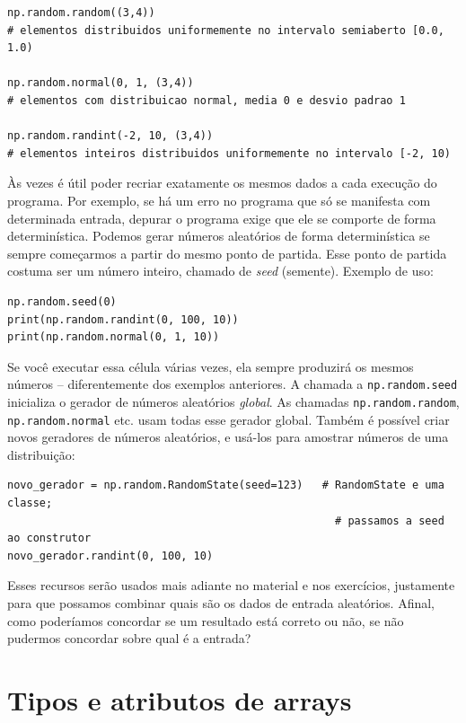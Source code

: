 \documentclass[11pt,a4paper]{article}
\begin{document}
\begin{lstlisting}
np.random.random((3,4))
# elementos distribuidos uniformemente no intervalo semiaberto [0.0, 1.0)

np.random.normal(0, 1, (3,4))
# elementos com distribuicao normal, media 0 e desvio padrao 1

np.random.randint(-2, 10, (3,4))
# elementos inteiros distribuidos uniformemente no intervalo [-2, 10)
\end{lstlisting}

Às vezes é útil poder recriar exatamente os mesmos dados a cada execução
do programa. Por exemplo, se há um erro no programa que só se manifesta
com determinada entrada, depurar o programa exige que ele se comporte de
forma determinística. Podemos gerar números aleatórios de forma
determinística se sempre começarmos a partir do mesmo ponto de partida.
Esse ponto de partida costuma ser um número inteiro, chamado de
\emph{seed} (semente). Exemplo de uso:

\begin{lstlisting}
np.random.seed(0)
print(np.random.randint(0, 100, 10))
print(np.random.normal(0, 1, 10))
\end{lstlisting}

Se você executar essa célula várias vezes, ela sempre produzirá os
mesmos números -- diferentemente dos exemplos anteriores. A chamada a
\texttt{np.random.seed} inicializa o gerador de números aleatórios
\emph{global}. As chamadas \texttt{np.random.random},
\texttt{np.random.normal} etc. usam todas esse gerador global. Também é
possível criar novos geradores de números aleatórios, e usá-los para
amostrar números de uma distribuição:

\begin{lstlisting}
novo_gerador = np.random.RandomState(seed=123)   # RandomState e uma classe;
                                                   # passamos a seed ao construtor
novo_gerador.randint(0, 100, 10)
\end{lstlisting}

Esses recursos serão usados mais adiante no material e nos exercícios,
justamente para que possamos combinar quais são os dados de entrada
aleatórios. Afinal, como poderíamos concordar se um resultado está
correto ou não, se não pudermos concordar sobre qual é a entrada?

\section{Tipos e atributos de arrays}
\end{document}
